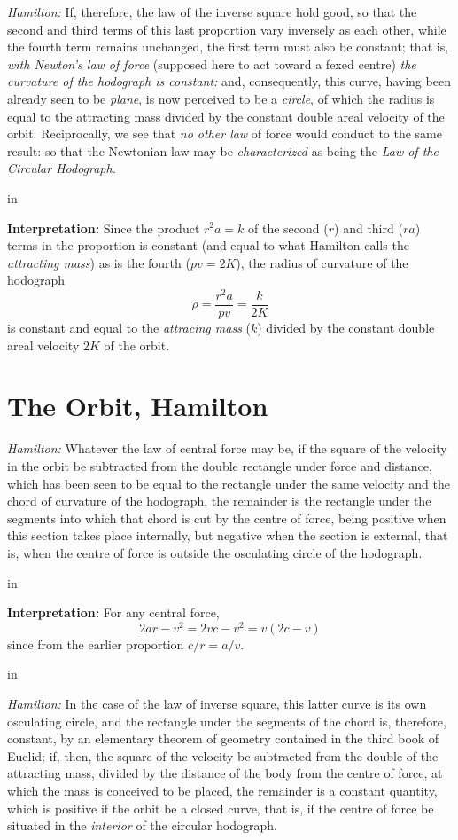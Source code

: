 \documentclass{ximera}
\newcommand{\pskip}{\vskip 0.1 in}
\begin{document}
\emph{Hamilton:} If, therefore, the law of the inverse square hold good, so that the second and third terms of this last proportion vary inversely as each other, while the fourth term remains unchanged, the first term must also be constant; that is, \emph{with Newton's law of force} (supposed here to act toward a fexed centre) \emph{the curvature of the hodograph is constant:} and, consequently, this curve, having been already seen to be \emph{plane}, is now perceived to be a \emph{circle}, of which the radius is equal to the attracting mass divided by the constant double areal velocity of the orbit. Reciprocally, we see that \emph{no other law} of force would conduct to the same result: so that the Newtonian law may be \emph{characterized} as being the \emph{Law of the Circular Hodograph.}

\pskip

{\bf Interpretation:} Since the product $r^2 a = k$ of the second ($r$) and third ($ra$) terms in the proportion is constant (and equal to what Hamilton calls the \emph{attracting mass}) as is the fourth ($pv = 2K$), the radius of curvature of the hodograph
\[
     \rho = \frac{r^2a}{pv} = \frac{k}{2K}
\]
is constant and equal to the \emph{attracing mass} ($k$) divided by the constant double areal velocity $2K$ of the orbit.


\section*{The Orbit, Hamilton}


\emph{Hamilton:} Whatever the law of central force may be, if the square of the velocity in the orbit be subtracted from the double rectangle under force and distance, which has been seen to be equal to the rectangle under the same velocity and the chord of curvature of the hodograph, the remainder is the rectangle under the segments into which that chord is cut by the centre of force, being positive when this section takes place internally, but negative when the section is external, that is, when the centre of force is outside the osculating circle of the hodograph.

\pskip

{\bf Interpretation:} For any central force,
\[
  2ar - v^2 =   2 v c - v^2      = v (2 c- v) 
\]
since from the earlier proportion $c/r  = a/v$.

\pskip

\emph{Hamilton:} In the case of the law of inverse square, this latter curve is its own osculating circle, and the rectangle under the segments of the chord is, therefore, constant, by an elementary theorem of geometry contained in the third book of Euclid; if, then, the square of the velocity be subtracted from the double of the attracting mass, divided by the distance of the body from the centre of force, at which the mass is conceived to be placed, the remainder is a constant quantity, which is positive if the orbit be a closed curve, that is, if the centre of force be situated in the \emph{interior} of the circular hodograph.
\end{document}
